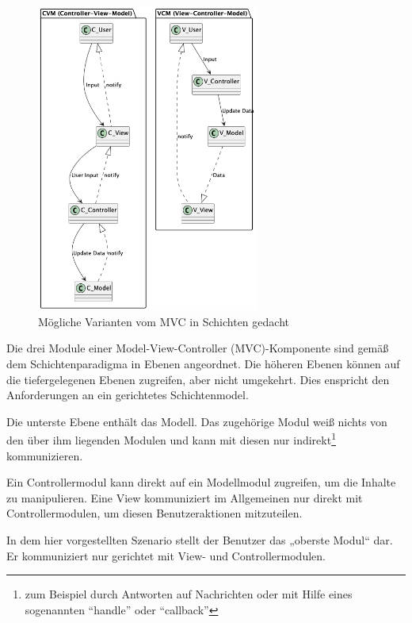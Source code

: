 \begin{figure}[ht]
  \centering
  \includegraphics[width=0.65\textwidth]{fig/uml/mvc-varianten.png}
  \caption{Mögliche Varianten vom MVC in Schichten gedacht}
  \label{fig:mvs-varianten}
\end{figure}

Die drei Module einer Model-View-Controller (MVC)-Komponente sind gemäß dem Schichtenparadigma in Ebenen angeordnet. Die höheren Ebenen können auf die tiefergelegenen Ebenen zugreifen, aber nicht umgekehrt. Dies enspricht den Anforderungen an ein gerichtetes Schichtenmodel. 

Die unterste Ebene enthält das Modell. Das zugehörige Modul weiß nichts von den über ihm liegenden Modulen und kann mit diesen nur indirekt\footnote{zum Beispiel durch Antworten auf Nachrichten oder mit Hilfe eines sogenannten \enquote{handle} oder \enquote{callback}} kommunizieren.

Ein Controllermodul kann direkt auf ein Modellmodul zugreifen, um die Inhalte zu manipulieren. Eine View kommuniziert im Allgemeinen nur direkt mit Controllermodulen, um diesen Benutzeraktionen mitzuteilen.

In dem hier vorgestellten Szenario stellt der Benutzer das „oberste Modul“ dar. Er kommuniziert nur gerichtet mit View- und Controllermodulen. 

